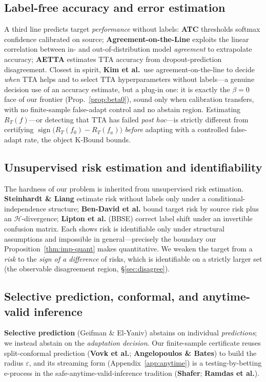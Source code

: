 \documentclass[conference]{IEEEtran}
\theoremstyle{plain}
\theoremstyle{definition}
\newcommand{\sign}{\operatorname{sign}}
\begin{document}
\subsection{Label-free accuracy and error estimation}
A third line predicts target \emph{performance} without labels: \textbf{ATC} thresholds
softmax confidence calibrated on source; \textbf{Agreement-on-the-Line} exploits the linear
correlation between in- and out-of-distribution model \emph{agreement} to extrapolate
accuracy; \textbf{AETTA} estimates TTA accuracy from dropout-prediction disagreement.
Closest in spirit, \textbf{Kim et al.}\ use agreement-on-the-line to decide \emph{when} TTA
helps and to select TTA hyperparameters without labels---a genuine decision use of an
accuracy estimate, but a plug-in one: it is exactly the $\beta{=}0$ face of our frontier
(Prop.~\ref{prop:beta0}), sound only when calibration transfers, with no finite-sample
false-adapt control and no abstain region.
Estimating $R_T(f)$---or detecting that TTA has failed \emph{post hoc}---is strictly different
from certifying $\sign\big(R_T(f_0)-R_T(f_a)\big)$ \emph{before} adapting with a controlled
false-adapt rate, the object K-Bound bounds.

\subsection{Unsupervised risk estimation and identifiability}
The hardness of our problem is inherited from unsupervised risk estimation.
\textbf{Steinhardt \& Liang} estimate risk without labels only under a conditional-independence
structure; \textbf{Ben-David et al.} bound target risk by source risk plus an
$\mathcal{H}$-divergence; \textbf{Lipton et al.} (BBSE) correct label shift under an invertible
confusion matrix. Each shows risk is identifiable only under structural assumptions and
impossible in general---precisely the boundary our Proposition~\ref{thm:imp-quant} makes
quantitative. We weaken the target from a \emph{risk} to the \emph{sign of a difference} of
risks, which is identifiable on a strictly larger set (the observable disagreement region,
\S\ref{sec:disagree}).

\subsection{Selective prediction, conformal, and anytime-valid inference}
\textbf{Selective prediction} (Geifman \& El-Yaniv) abstains on individual \emph{predictions};
we instead abstain on the \emph{adaptation decision}. Our finite-sample certificate reuses
split-conformal prediction (\textbf{Vovk et al.}; \textbf{Angelopoulos \& Bates}) to build the
radius $\varepsilon$, and its streaming form (Appendix~\ref{app:anytime}) is a
testing-by-betting e-process in the safe-anytime-valid-inference tradition (\textbf{Shafer};
\textbf{Ramdas et al.}).
\end{document}
